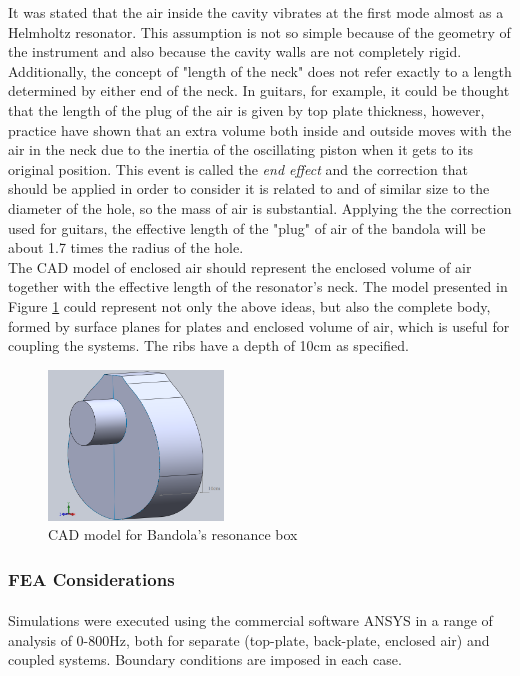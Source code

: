 It was stated that the air inside the cavity vibrates at the first mode almost as a Helmholtz resonator. This assumption is not so simple because of the geometry of the instrument and also because the cavity walls are not completely rigid. Additionally, the concept of "length of the neck" does not refer exactly to a length determined by either end of the neck. In guitars, for example, it could be thought that the length of the plug of the air is given by top plate thickness, however, practice have shown that an extra volume both inside and outside moves with the air in the neck due to the inertia of the oscillating piston when it gets to its original position. This event is called the \emph{end effect} and the correction that should be applied in order to consider it is related to and of similar size to the diameter of the hole, so the mass of air is substantial. Applying the the correction used for guitars, the effective length of the "plug" of air of the bandola will be about 1.7 times the radius of the hole.\\

The CAD model of enclosed air should represent the enclosed volume of air together with the effective length of the resonator's neck. The model presented in Figure \ref{CADBody} could represent not only the above ideas, but also the complete body, formed by surface planes for plates and enclosed volume of air, which is useful for coupling the systems. The ribs have a depth of 10cm as specified.

\begin{figure}[h]
\centering
\includegraphics[height=4cm]{img/CADBody.png}
\caption{CAD model for Bandola's resonance box}
\label{CADBody}
\end{figure}

\subsubsection{FEA Considerations}

Simulations were executed using the commercial software ANSYS\textsuperscript{\textregistered} in a range of analysis of 0-800Hz, both for separate (top-plate, back-plate, enclosed air) and coupled systems. Boundary conditions are imposed in each case.\\

